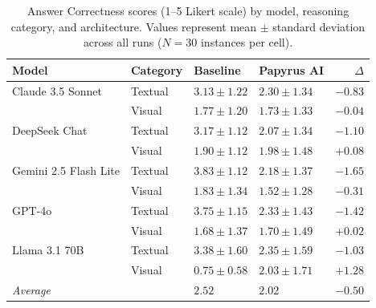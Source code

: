 \begin{table}[htbp]
\caption{Answer Correctness scores (1--5 Likert scale) by model,
reasoning category, and architecture. Values represent mean $\pm$
standard deviation across all runs ($N=30$ instances per cell).}
\label{tab:correctness_full}
\begin{tabularx}{\textwidth}{llXXr}
\toprule
\textbf{Model} & \textbf{Category} & \textbf{Baseline} &
\textbf{Papyrus AI} & \textbf{$\Delta$} \\
\midrule
  Claude 3.5 Sonnet & Textual & $3.13 \pm 1.22$ & $2.30 \pm 1.34$ & $-0.83$ \\
   & Visual & $1.77 \pm 1.20$ & $1.73 \pm 1.33$ & $-0.04$ \\
  DeepSeek Chat & Textual & $3.17 \pm 1.12$ & $2.07 \pm 1.34$ & $-1.10$ \\
   & Visual & $1.90 \pm 1.12$ & $1.98 \pm 1.48$ & $+0.08$ \\
  Gemini 2.5 Flash Lite & Textual & $3.83 \pm 1.12$ & $2.18 \pm 1.37$ & $-1.65$ \\
   & Visual & $1.83 \pm 1.34$ & $1.52 \pm 1.28$ & $-0.31$ \\
  GPT-4o & Textual & $3.75 \pm 1.15$ & $2.33 \pm 1.43$ & $-1.42$ \\
   & Visual & $1.68 \pm 1.37$ & $1.70 \pm 1.49$ & $+0.02$ \\
  Llama 3.1 70B & Textual & $3.38 \pm 1.60$ & $2.35 \pm 1.59$ & $-1.03$ \\
   & Visual & $0.75 \pm 0.58$ & $2.03 \pm 1.71$ & $+1.28$ \\
\midrule
  \textit{Average} & & $2.52$ & $2.02$ & $-0.50$ \\
\bottomrule
\end{tabularx}
\end{table}
